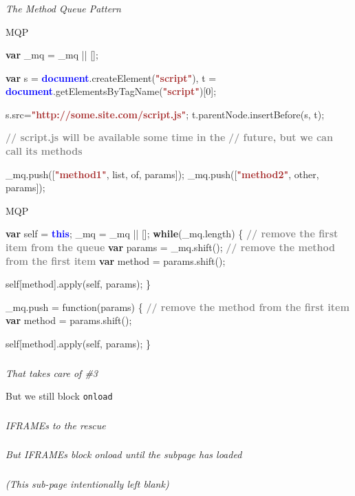 \documentclass{beamer}
\newcommand{\innersplash}[1]{
  \begin{center}
    \Large \textrm{\textit{ #1 } }
  \end{center}
}
\newcommand{\splashslide}[2][{}]{
  \begin{frame}
  \frametitle{#1}
  \innersplash{#2}
  \end{frame}
}
\def\gray<#1>#2{\textcolor<#1>{gray}{\textbf<#1>{#2}}}
\def\brown<#1>#2{\textcolor<#1>{brown}{\textbf<#1>{#2}}}
\def\green<#1>#2{\textcolor<#1>{dark-green}{\textbf<#1>{#2}}}
\def\blue<#1>#2{\textcolor<#1>{blue}{\textbf<#1>{#2}}}
\begin{document}
\splashslide{The Method Queue Pattern}

\begin{frame}[fragile]{MQP}
\begin{semiverbatim}
\green<1>{var} \_mq = \_mq || [];

\green<1>{var} s = \blue<1>{document}.createElement(\brown<1>{"script"}),
    t = \blue<1>{document}.getElementsByTagName(\brown<1>{"script"})[0];

s.src=\brown<1>{"http://some.site.com/script.js"};
t.parentNode.insertBefore(s, t);

\gray<1>{// script.js will be available some time in the}
\gray<1>{// future, but we can call its methods}

\_mq.push([\brown<1>{"method1"}, list, of, params]);
\_mq.push([\brown<1>{"method2"}, other, params]);
\end{semiverbatim}
\end{frame}

\begin{frame}[fragile]{MQP}
\begin{semiverbatim}
\green<1>{var} self = \blue<1>{this};
\_mq = \_mq || [];
\green<1>{while}(\_mq.length) \{
    \gray<1>{// remove the first item from the queue}
    \green<1>{var} params = \_mq.shift();
    \gray<1>{// remove the method from the first item}
    \green<1>{var} method = params.shift();

    self[method].apply(self, params);
\}

\_mq.push = function(params) \{
    \gray<1>{// remove the method from the first item}
    \green<1>{var} method = params.shift();

    self[method].apply(self, params);
\}
\end{semiverbatim}
\end{frame}

\splashslide{That takes care of \#3}

\begin{frame}{But we still block \texttt{onload}}
\end{frame}

\splashslide{IFRAMEs to the rescue}

\splashslide{But IFRAMEs block onload until the subpage has loaded}

\splashslide{(This sub-page intentionally left blank)}
\end{document}

